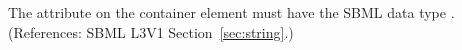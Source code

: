 The  attribute on the  container element
must have the SBML data type .  (References: SBML
L3V1 Section~\ref{sec:string}.)
